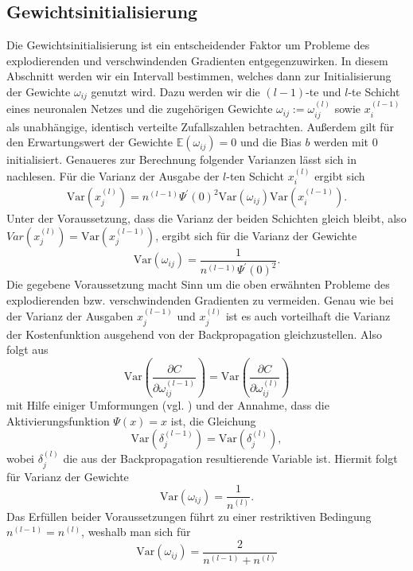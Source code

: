 \subsection{Gewichtsinitialisierung}
\label{subsec:gewichtsinitialisierung}
Die Gewichtsinitialisierung ist ein entscheidender Faktor um Probleme des explodierenden und verschwindenden Gradienten
entgegenzuwirken. In diesem Abschnitt werden wir ein Intervall bestimmen, welches dann zur Initialisierung der Gewichte
$\omega_{ij}$ genutzt wird. Dazu werden wir die $(l-1)$-te und $l$-te Schicht eines neuronalen Netzes und die
zugehörigen Gewichte $\omega_{ij}:=\omega_{ij}^{(l)}$ sowie $x_{i}^{(l-1)}$ als unabhängige, identisch verteilte
Zufallszahlen betrachten. Außerdem gilt für den Erwartungswert der Gewichte $\mathbb{E}(\omega_{ij})=0$ und die Bias $b$
werden mit $0$ initialisiert. Genaueres zur Berechnung folgender Varianzen lässt sich in
\cite[191-195]{ovidiucalinDeepLearningArchitectures} nachlesen. Für die Varianz der Ausgabe der $l$-ten Schicht
$x_i^{(l)}$ ergibt sich
\begin{align*}
    \mathrm{Var}(x_j^{(l)}) = n^{(l-1)} \Psi^{\prime}(0)^2 \mathrm{Var}(\omega_{ij}) \mathrm{Var}(x_i^{(l-1)}).
\end{align*}
Unter der Voraussetzung, dass die Varianz der beiden Schichten gleich bleibt, also \\
$Var(x_j^{(l)})=\mathrm{Var}(x_j^{(l-1)})$, ergibt sich für die Varianz der Gewichte
\[
        \mathrm{Var}(\omega_{ij}) = \frac{1}{n^{(l-1)}\Psi^{\prime}(0)^2}.
\]
Die gegebene Voraussetzung macht Sinn um die oben erwähnten Probleme des explodierenden bzw. verschwindenden Gradienten
zu vermeiden. Genau wie bei der Varianz der Ausgaben $x_j^{(l-1)}$ und $x_j^{(l)}$ ist es auch vorteilhaft die Varianz
der Kostenfunktion ausgehend von der Backpropagation gleichzustellen. Also folgt aus
\[
    \mathrm{Var}\left(\frac{\partial C}{\partial \omega_{ij}^{(l-1)}}\right) = \mathrm{Var}\left(\frac{\partial C}{\partial \omega_{ij}^{(l)}}\right)
\]
mit Hilfe einiger Umformungen (vgl. \cite[191-195]{ovidiucalinDeepLearningArchitectures}) und der Annahme, dass die
Aktivierungsfunktion $\Psi(x)=x$ ist, die Gleichung
\[
    \mathrm{Var}(\delta_j^{(l-1)}) = \mathrm{Var}(\delta_j^{(l)}),
\]
wobei $\delta_j^{(l)}$ die aus der Backpropagation resultierende Variable ist. Hiermit folgt für Varianz der Gewichte
\[
    \mathrm{Var}(\omega_{ij}) = \frac{1}{n^{(l)}}.
\]
Das Erfüllen beider Voraussetzungen führt zu einer restriktiven Bedingung $n^{(l-1)} = n^{(l)}$, weshalb man sich für
\[
    \mathrm{Var}(\omega_{ij})= \frac{2}{n^{(l-1)} + n^{(l)}}
\]
